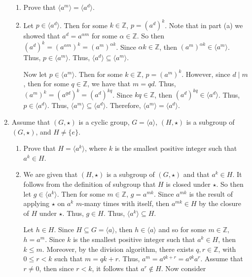 \documentclass[12pt]{article}
\makeatletter
\theoremstyle{definition}
\theoremstyle{remark}
\renewenvironment{proof}[1][\proofname]{\par
  \pushQED{\qed}%
  \normalfont \topsep6\p@\@plus6\p@\relax
  \list{}{\leftmargin=0mm
          \rightmargin=4mm
          \settowidth{\itemindent}{\itshape#1}%
          \labelwidth=\itemindent
          \parsep=0pt \listparindent=\parindent 
  }
  \item[\hskip\labelsep
        \itshape
    #1\@addpunct{.}]\ignorespaces
}{%
  \popQED\endlist\@endpefalse
}
\let\oldproofname=\proofname
\renewcommand{\proofname}{\bf{\textit{\oldproofname}}}
\makeatother
\begin{document}
\begin{enumerate}[leftmargin=*]
\begin{enumerate}[label=(\alph*)]
            \item Prove that $\langle a^m\rangle=\langle a^d\rangle$.
                \begin{proof}
                    Let $p\in\langle a^d\rangle$. Then for some $k\in\mathbb{Z}$, $p=(a^d)^k$. Note that in part (a) we showed that $a^d=a^{\alpha m}$ for some $\alpha\in\mathbb{Z}$. So then $(a^d)^k=(a^{\alpha m})^k=(a^m)^{\alpha k}$. Since $\alpha k\in\mathbb{Z}$, then $(a^m)^{\alpha k}\in\langle a^m\rangle$. Thus, $p\in\langle a^m\rangle$. Thus, $\langle a^d\rangle\subseteq\langle a^m\rangle$.\par\hspace{4mm} Now let $p\in\langle a^m\rangle$. Then for some $k\in\mathbb{Z}$, $p=(a^m)^k$. However, since $d\mid m$, then for some $q\in\mathbb{Z}$, we have that $m=qd$. Thus, $(a^m)^k=(a^{qd})^k=(a^d)^{kq}$. Since $kq\in\mathbb{Z}$, then $(a^d)^{kq}\in\langle a^d\rangle$. Thus, $p\in\langle a^d\rangle$. Thus,  $\langle a^m\rangle\subseteq\langle a^d\rangle$. Therefore, $\langle a^m\rangle =\langle a^d\rangle$.
                \end{proof}
            
        \end{enumerate}
        
    \item Assume that $(G,\star)$ is a cyclic group, $G=\langle a\rangle$, $(H,\star)$ is a subgroup of $(G,\star)$, and $H\neq\{e\}$.
    
        \begin{enumerate}[label=(\alph*)]
            \item Prove that $H=\langle a^k\rangle$, where $k$ is the smallest positive integer such that $a^k\in H$.
            
                \begin{proof}
                    We are given that $(H,\star)$ is a subgroup of $(G,\star)$ and that $a^k\in H$. It follows from the definition of subgroup that $H$ is closed under $\star$. So then let $g\in\langle a^k\rangle$. Then for some $m\in\mathbb{Z}$, $g=a^{mk}$. Since $a^{mk}$ is the result of applying $\star$ on $a^k$ $m$-many times with itself, then $a^{mk}\in H$ by the closure of $H$ under $\star$. Thus, $g\in H$. Thus, $\langle a^k\rangle\subseteq H$.\par\hspace{4mm} Let $h\in H$. Since $H\subseteq G=\langle a\rangle$, then $h\in \langle a\rangle$ and so for some $m\in\mathbb{Z}$, $h=a^m$. Since $k$ is the smallest positive integer such that $a^k\in H$, then $k\leq m$. Moreover, by the division algorithm, there exists $q,r\in\mathbb{Z}$, with $0\leq r<k$ such that $m=qk+r$. Thus, $a^m=a^{qk+r}=a^{qk}a^r$. Assume that $r\neq 0$, then since $r<k$, it follows that $a^r\notin H$. Now consider
                    

\end{proof}
\end{enumerate}
\end{enumerate}
\end{document}
